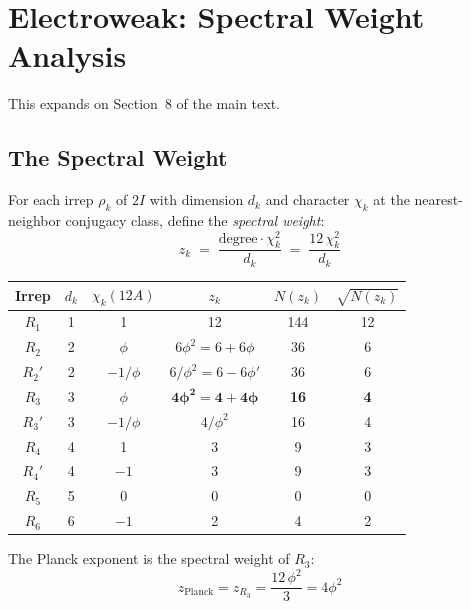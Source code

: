 \documentclass[12pt,a4paper]{article}
\theoremstyle{definition}
\begin{document}
\section{Electroweak: Spectral Weight Analysis}
\label{sec:S-ew}

This expands on Section~8 of the main text.

\subsection{The Spectral Weight}
\label{sec:S-spectral-weight}

For each irrep $\rho_k$ of $2I$ with dimension $d_k$ and character $\chi_k$ at the nearest-neighbor conjugacy class, define the \emph{spectral weight}:
\begin{equation}
z_k \;=\; \frac{\text{degree} \cdot \chi_k^2}{d_k} \;=\; \frac{12\,\chi_k^2}{d_k}
\end{equation}

\begin{center}
\begin{tabular}{cccccc}
\toprule
Irrep & $d_k$ & $\chi_k(12A)$ & $z_k$ & $N(z_k)$ & $\sqrt{N(z_k)}$ \\
\midrule
$R_1$ & 1 & 1        & 12       & 144 & 12 \\
$R_2$ & 2 & $\phi$   & $6\phi^2 = 6+6\phi$  & 36  & 6 \\
$R_2'$& 2 & $-1/\phi$& $6/\phi^2 = 6-6\phi'$ & 36  & 6 \\
$R_3$ & 3 & $\phi$   & $\mathbf{4\phi^2 = 4+4\phi}$  & \textbf{16}  & \textbf{4} \\
$R_3'$& 3 & $-1/\phi$& $4/\phi^2$ & 16  & 4 \\
$R_4$ & 4 & 1        & 3        & 9   & 3 \\
$R_4'$& 4 & $-1$     & 3        & 9   & 3 \\
$R_5$ & 5 & 0        & 0        & 0   & 0 \\
$R_6$ & 6 & $-1$     & 2        & 4   & 2 \\
\bottomrule
\end{tabular}
\end{center}

The Planck exponent is the spectral weight of $R_3$:
\begin{equation}
z_{\text{Planck}} = z_{R_3} = \frac{12\,\phi^2}{3} = 4\phi^2
\end{equation}
\end{document}
